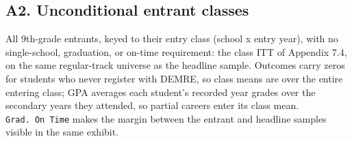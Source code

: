 \documentclass[
]{article}
\begin{document}
\begin{table}[htbp]
   \caption{Effect on Enrollment in Any Higher-Education Institution by Gender}\label{tab: net enrollment by gender}
   \centerline{}
\end{table}

\hypertarget{a2.-unconditional-entrant-classes}{%
\subsection{A2. Unconditional entrant
classes}\label{a2.-unconditional-entrant-classes}}

All 9th-grade entrants, keyed to their entry class (school x entry
year), with no single-school, graduation, or on-time requirement: the
class ITT of Appendix 7.4, on the same regular-track universe as the
headline sample. Outcomes carry zeros for students who never register
with DEMRE, so class means are over the entire entering class; GPA
averages each student's recorded year grades over the secondary years
they attended, so partial careers enter its class mean.
\texttt{Grad.\ On\ Time} makes the margin between the entrant and
headline samples visible in the same exhibit.
\end{document}
